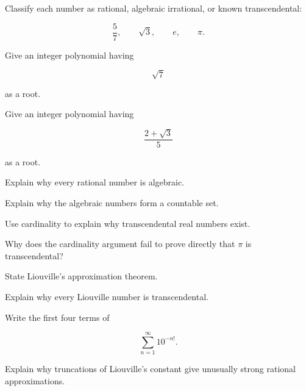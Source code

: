 \begin{exercise}[1]
Classify each number as rational, algebraic irrational, or known
transcendental:

\[ \frac57,\qquad\sqrt3,\qquad e,\qquad\pi. \]
\end{exercise}

\begin{exercise}[1]
Give an integer polynomial having

\[ \sqrt7 \]

as a root.
\end{exercise}

\begin{exercise}[1]
Give an integer polynomial having

\[ \frac{2+\sqrt3}{5} \]

as a root.
\end{exercise}

\begin{exercise}[2]
Explain why every rational number is algebraic.
\end{exercise}

\begin{exercise}[2]
Explain why the algebraic numbers form a countable set.
\end{exercise}

\begin{exercise}[2]
Use cardinality to explain why transcendental real numbers exist.
\end{exercise}

\begin{exercise}[2]
Why does the cardinality argument fail to prove directly that \(\pi\) is
transcendental?
\end{exercise}

\begin{exercise}[2]
State Liouville's approximation theorem.
\end{exercise}

\begin{exercise}[2]
Explain why every Liouville number is transcendental.
\end{exercise}

\begin{exercise}[2]
Write the first four terms of

\[ \sum_{n=1}^{\infty}10^{-n!}. \]
\end{exercise}

\begin{exercise}[3]
Explain why truncations of Liouville's constant give unusually strong
rational approximations.
\end{exercise}

